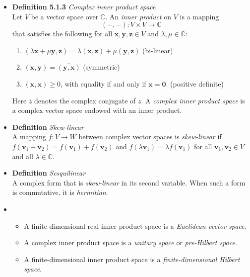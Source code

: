 \documentclass[11pt,a4paper]{article}
\begin{document}
\begin{itemize}
    \item \textbf{Definition 5.1.3} \emph{Complex inner product space} \\
        Let $V$ be a vector space over $\mathbb{C}$.
        An \emph{inner product} on $V$ is a mapping
        \[
            (-, -) : V \times V \to \mathbb{C}
        \]
        that satisfies the following for all $\mathbf{x}, \mathbf{y}, \mathbf{z} \in V$
        and $\lambda, \mu \in \mathbb{C}$:
        \begin{enumerate}
            \item $(\lambda \mathbf{x} + \mu \mathbf{y}, \mathbf{z}) =
                \lambda(\mathbf{x}, \mathbf{z}) + \mu(\mathbf{y}, \mathbf{z})$
                \quad (bi-linear)
            \item $(\mathbf{x}, \mathbf{y}) = \overline{(\mathbf{y}, \mathbf{x})}$
                \quad (symmetric)
            \item $(\mathbf{x}, \mathbf{x}) \geq 0$,
                with equality if and only if $\mathbf{x} = \mathbf{0}$.
                \quad (positive definite)
        \end{enumerate}
        Here $\overline{z}$ denotes the complex conjugate of $z$.
        A \emph{complex inner product space} is a complex vector space endowed with an inner
        product.

    \item \textbf{Definition} \emph{Skew-linear} \\
        A mapping $f : V \to W$ between complex vector spaces is \emph{skew-linear}
        if $f(\mathbf{v}_1 + \mathbf{v}_2) = f(\mathbf{v}_1) + f(\mathbf{v}_2)$
        and $f(\lambda \mathbf{v}_1) = \overline{\lambda} f(\mathbf{v}_1)$
        for all $\mathbf{v}_1, \mathbf{v}_2 \in V$ and all $\lambda \in \mathbb{C}$.

    \item \textbf{Definition} \emph{Sesquilinear} \\
        A complex form that is \emph{skew-linear} in its second variable.
        When such a form is commutative, it is \emph{hermitian}.

    \item {}
        \begin{itemize}
            \item A finite-dimensional real inner product space is a
                \emph{Euclidean vector space}.
            \item A complex inner product space is a \emph{unitary space}
                or \emph{pre-Hilbert space}.
            \item A finite-dimensional inner product space is a
                \emph{finite-dimensional Hilbert space}.
        \end{itemize}


\end{itemize}
\end{document}
